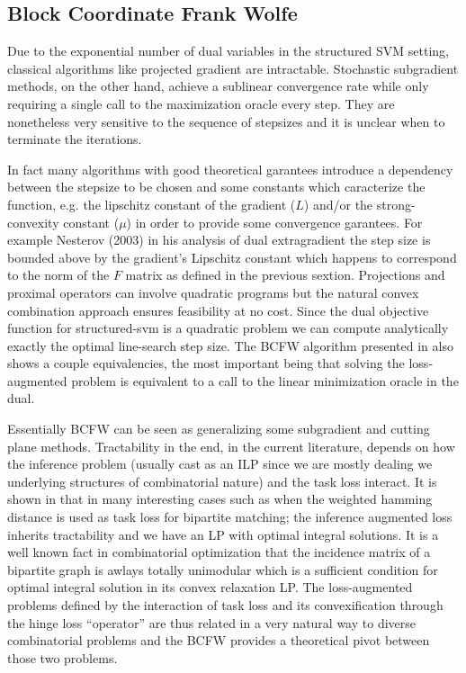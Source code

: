 \subsection{Block Coordinate Frank Wolfe}
Due to the exponential number of dual variables in the structured SVM setting,
classical algorithms like projected gradient are intractable. Stochastic
subgradient methods, on the other hand, achieve a sublinear convergence rate
while only requiring a single call to the maximization oracle every step. They
are nonetheless very sensitive to the sequence of stepsizes and it is unclear
when to terminate the iterations. 

In fact many algorithms with good theoretical garantees introduce a dependency
between the stepsize to be chosen and some constants which caracterize the
function, e.g. the lipschitz constant of the gradient ($L$) and/or the
strong-convexity constant ($\mu$) in order to provide some convergence
garantees. For example Nesterov (2003) in his analysis of dual extragradient the
step size is bounded above by the gradient's Lipschitz constant which happens to
correspond to the norm of the $F$ matrix as defined in the previous sextion.
Projections and proximal operators can involve quadratic programs but the
natural convex combination approach ensures feasibility at no cost. Since the
dual objective function for structured-svm is a quadratic problem we can compute
analytically exactly the optimal line-search step size. The BCFW algorithm
presented in \citet{lacoste-julienBlockCoordinateFrankWolfeOptimization2013}
also shows a couple equivalencies, the most important being that solving the
loss-augmented problem is equivalent to a call to the linear minimization oracle
in the dual.

Essentially BCFW can be seen as generalizing some subgradient and cutting plane
methods. Tractability in the end, in the current literature, depends on how the
inference problem (usually cast as an ILP since we are mostly dealing we
underlying structures of combinatorial nature) and the task loss interact. It is
shown in \cite{taskarStructuredPredictionDual2006} that in many interesting
cases such as when the weighted hamming distance is used as task loss for
bipartite matching; the inference augmented loss inherits tractability and we
have an LP with optimal integral solutions. It is a well known fact in
combinatorial optimization that the incidence matrix of a bipartite graph is
awlays totally unimodular which is a sufficient condition for optimal integral
solution in its convex relaxation LP. The loss-augmented problems defined by the
interaction of task loss and its convexification through the hinge loss
``operator'' are thus related in a very natural way to diverse combinatorial
problems and the BCFW provides a theoretical pivot between those two problems.




